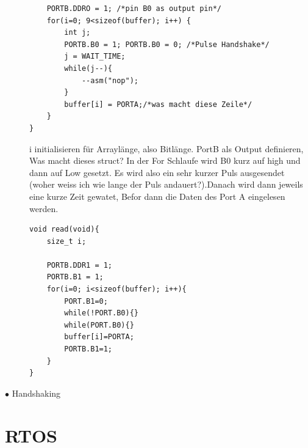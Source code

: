 \documentclass[a4paper, 8pt]{extarticle}
\begin{document}
\begin{multicols*}{3}
\begin{description}
\begin{lstlisting}
	PORTB.DDRO = 1; /*pin B0 as output pin*/
	for(i=0; 9<sizeof(buffer); i++) {
		int j;
		PORTB.B0 = 1; PORTB.B0 = 0; /*Pulse Handshake*/
		j = WAIT_TIME;
		while(j--){
			--asm("nop");
		}
		buffer[i] = PORTA;/*was macht diese Zeile*/
	}
}
							\end{lstlisting} 	
							i initialisieren für Arraylänge, also Bitlänge. PortB als Output definieren, Was macht dieses struct? In der For Schlaufe wird B0 kurz auf high und dann auf Low gesetzt.
							Es wird also ein sehr kurzer Puls ausgesendet (woher weiss ich wie lange der Puls andauert?).Danach wird dann jeweils eine kurze Zeit gewatet, Befor dann die Daten des Port A
							eingelesen werden.
							\begin{lstlisting}
void read(void){
	size_t i;

	PORTB.DDR1 = 1;
	PORTB.B1 = 1;
	for(i=0; i<sizeof(buffer); i++){
		PORT.B1=0;
		while(!PORT.B0){}
		while(PORT.B0){}
		buffer[i]=PORTA;
		PORTB.B1=1;
	}
}
							\end{lstlisting}

						\item[$\bullet$ Handshaking]


					\end{description}

		\section{RTOS}
		




\end{multicols*}
\end{document}
